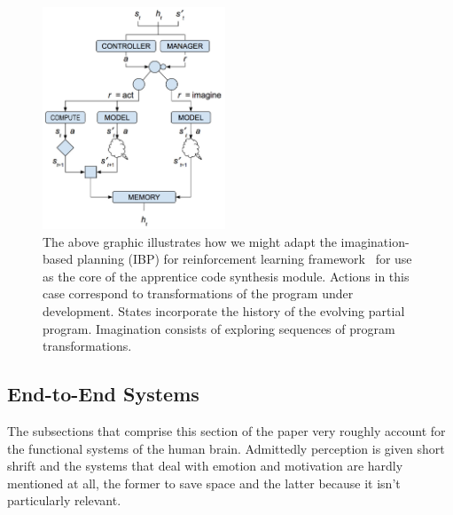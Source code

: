 \documentclass[letterpaper,11pt]{article}
\def\urlh#1{{}}
\begin{document}
\begin{figure}
%
  \begin{center} 
    \includegraphics[width=2.15in]{./figures/Graph_Nets_Imagination_Coding.jpg} %
  \end{center}
%
  \caption{The above graphic illustrates how we might adapt the imagination-based planning (IBP) for reinforcement learning framework~\cite{PascanuetalCoRR-17} for use as the core of the apprentice code synthesis module. Actions in this case correspond to transformations of the program under development. States incorporate the history of the evolving partial program. Imagination consists of exploring sequences of program transformations.}
%
  \label{fig_imagine}
%
\end{figure}



\subsection{End-to-End Systems}
\label{subsection_end-to-end_system}




The subsections that comprise this section of the paper very roughly account for the functional systems of the human brain. Admittedly perception is given short shrift and the systems that deal with emotion and motivation are hardly mentioned at all, the former to save space and the latter because it isn't particularly relevant.
\end{document}

